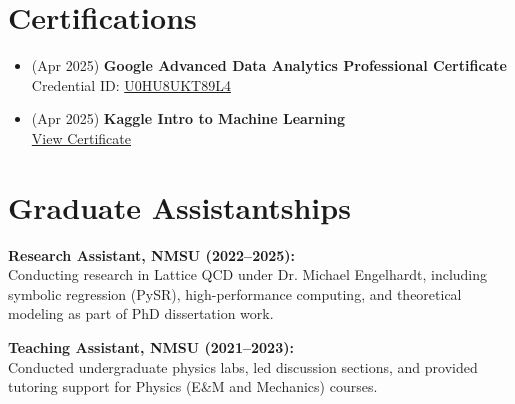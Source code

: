 \documentclass[11pt]{article}
\begin{document}
\section*{Certifications}
\vspace{-0.3em}
\begin{itemize}
    \item (Apr 2025) \textbf{Google Advanced Data Analytics Professional Certificate} \\
    Credential ID: \href{https://www.coursera.org/account/accomplishments/professional-cert/certificate/U0HU8UKT89L4}{U0HU8UKT89L4} 
    \item (Apr 2025) \textbf{Kaggle Intro to Machine Learning} \\
    \href{https://www.kaggle.com/learn/certification/hariprashadravikumar/intro-to-machine-learning}{View Certificate} 
\end{itemize}

\section*{Graduate Assistantships}

\vspace{-0.3em}
\textbf{Research Assistant, NMSU (2022–2025):} \\
Conducting research in Lattice QCD under Dr. Michael Engelhardt, including symbolic regression (PySR), high-performance computing, and theoretical modeling as part of PhD dissertation work.

\vspace{-0.3em}
\textbf{Teaching Assistant, NMSU (2021–2023):} \\
Conducted undergraduate physics labs, led discussion sections, and provided tutoring support for Physics (E\&M and Mechanics) courses.
\end{document}
